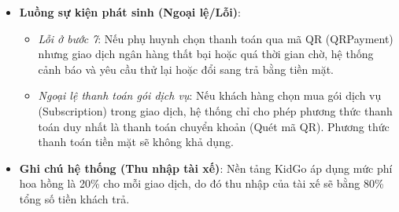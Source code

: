 \documentclass[../DoAn.tex]{subfiles}
\begin{document}
\begin{itemize}
\begin{enumerate}
              \item Phụ huynh hoàn tất thủ tục và hệ thống tạo mới giao dịch thanh toán, ghi nhận chuyến đi thành công.
          \end{enumerate}
    \item \textbf{Luồng sự kiện phát sinh (Ngoại lệ/Lỗi)}:
          \begin{itemize}
              \item \textit{Lỗi ở bước 7}: Nếu phụ huynh chọn thanh toán qua mã QR (QRPayment) nhưng giao dịch ngân hàng thất bại hoặc quá thời gian chờ, hệ thống cảnh báo và yêu cầu thử lại hoặc đổi sang trả bằng tiền mặt.
              \item \textit{Ngoại lệ thanh toán gói dịch vụ}: Nếu khách hàng chọn mua gói dịch vụ (Subscription) trong giao dịch, hệ thống chỉ cho phép phương thức thanh toán duy nhất là thanh toán chuyển khoản (Quét mã QR). Phương thức thanh toán tiền mặt sẽ không khả dụng.
          \end{itemize}
    \item \textbf{Ghi chú hệ thống (Thu nhập tài xế)}: Nền tảng KidGo áp dụng mức phí hoa hồng là 20\% cho mỗi giao dịch, do đó thu nhập của tài xế sẽ bằng 80\% tổng số tiền khách trả.
\end{itemize}
\end{document}
